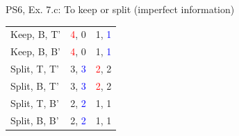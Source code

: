 \begin{frame}{PS6, Ex. 7.c: To keep or split (imperfect information)}
\begin{multicols}{2}
\begin{table}
\begin{tabular}{l|c|c|}
        Keep, B, T' & \textcolor{red}{4}, 0 & 1, \textcolor{blue}{1} \\\cline{2-3}
        Keep, B, B' & \textcolor{red}{4}, 0 & 1, \textcolor{blue}{1} \\\cline{2-3}
        Split, T, T' & 3, \textcolor{blue}{3} & \textcolor{red}{2}, 2 \\\cline{2-3}
        Split, B, T' & 3, \textcolor{blue}{3} & \textcolor{red}{2}, 2 \\\cline{2-3}
        Split, T, B' & 2, \textcolor{blue}{2} & 1, 1 \\\cline{2-3}
        Split, B, B' & 2, \textcolor{blue}{2} & 1, 1 \\\cline{2-3}
      \end{tabular}
    \end{table}
    \vfill\null
  \end{multicols}
\end{frame}
